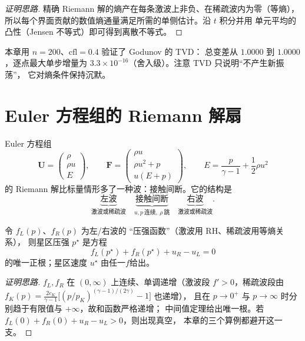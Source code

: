 \begin{proof}[证明思路]
精确 Riemann 解的熵产在每条激波上非负、在稀疏波内为零（等熵），
所以每个界面贡献的数值熵通量满足所需的单侧估计。沿 $t$ 积分并用
单元平均的凸性（Jensen 不等式）即可得到离散不等式。
\end{proof}

本章用 $n=200$、$\text{cfl}=0.4$ 验证了 Godunov 的 TVD：
总变差从 $1.0000$ 到 $1.0000$，逐点最大单步增量为
$3.3\times10^{-16}$（舍入级）。注意 TVD 只说明``不产生新振荡''，
它对熵条件保持沉默。

\section{Euler 方程组的 Riemann 解扇}

Euler 方程组
\begin{equation}
  \mathbf U=\begin{pmatrix}\rho\\ \rho u\\ E\end{pmatrix},
  \qquad
  \mathbf F=\begin{pmatrix}\rho u\\ \rho u^2+p\\ u(E+p)\end{pmatrix},
  \qquad
  E=\frac{p}{\gamma-1}+\frac12\rho u^2
  \label{eq:euler}
\end{equation}
的 Riemann 解比标量情形多了一种波：接触间断。它的结构是
\begin{equation}
  \underbrace{\text{左波}}_{\text{激波或稀疏波}}\quad
  \underbrace{\text{接触间断}}_{u,p\ \text{连续},\ \rho\ \text{跳}}\quad
  \underbrace{\text{右波}}_{\text{激波或稀疏波}} .
  \label{eq:fan}
\end{equation}

\begin{theorem}[星区压强方程]
\label{thm:pstar}
令 $f_L(p)$、$f_R(p)$ 为左/右波的 ``压强函数''（激波用 RH、稀疏波用等熵关系），
则星区压强 $p^\star$ 是方程
\begin{equation}
  f_L(p^\star)+f_R(p^\star)+u_R-u_L=0
  \label{eq:pstar}
\end{equation}
的唯一正根；星区速度 $u^\star$ 由任一$f$给出。
\end{theorem}

\begin{proof}[证明思路]
$f_L,f_R$ 在 $(0,\infty)$ 上连续、单调递增（激波段 $f'>0$，稀疏波段由
$f_K(p)=\frac{2c_K}{\gamma-1}\bigl[(p/p_K)^{(\gamma-1)/(2\gamma)}-1\bigr]$ 也递增），
且在 $p\to0^+$ 与 $p\to\infty$ 时分别趋于有限值与 $+\infty$，故和函数严格递增；
中间值定理给出唯一根。若 $f_L(0)+f_R(0)+u_R-u_L>0$，则出现真空，
本章的三个算例都避开这一支。
\end{proof}

